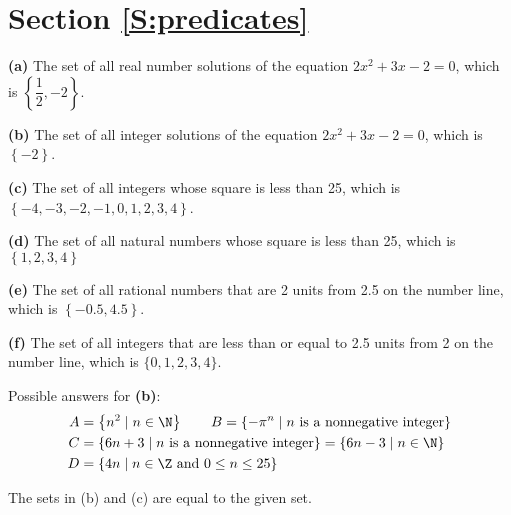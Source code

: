 \section*{Section \ref{S:predicates}}

\begin{list}{\bf{\ref{exer:sec21-1}.}} 
\item  \begin{description}
\item {\bf{(a)}}  The set of all real number solutions of the equation $2x^2 + 3x - 2 = 0$, which is $\left\{ {\dfrac{1}{2}, - 2} \right\}$. 
\item {\bf{(b)}} The set of all integer solutions of the equation $2x^2 + 3x - 2 = 0$, which is $\left\{ {- 2} \right\}$.
\item {\bf{(c)}} The set of all integers whose square is less than 25, which is \\$\left\{ -4, -3, -2, -1, 0, 1, 2, 3, 4 \right\}$.
\item {\bf{(d)}} The set of all natural numbers whose square is less than 25, which is $\left\{ {1,2,3,4} \right\}$
\item {\bf{(e)}} The set of all rational numbers that are 2 units from 2.5 on the number line, which is $\left\{ {-0.5,4.5} \right\}$.
\item {\bf{(f)}} The set of all integers that are less than or equal to 2.5 units from 2 on the number line, which is $\{0, 1, 2, 3, 4\}$.
\end{description}
\end{list}

\begin{list}{\bf{\ref{exer:setbuilder}.}}
\item Possible answers for {\bf{(b)}}:
\begin{align*}
A &= \left\{ n^2 \mid n \in \N \right\}  \qquad B = \left\{ -\pi^n \mid n \text{~is a nonnegative integer} \right\} \\
C &= \left\{ 6n + 3 \mid n \text{~is a nonnegative integer} \right\}  = \left\{6n - 3 \mid n \in \N \right\}\\
D &= \left\{ 4n \mid n \in \Z \text{~and~} 0 \leq n \leq 25 \right\}
\end{align*}
\end{list}


\begin{list}{\bf{\ref{exer:sec21-2}.}}  
\item The sets in (b) and (c) are equal to the given set.
\end{list}

